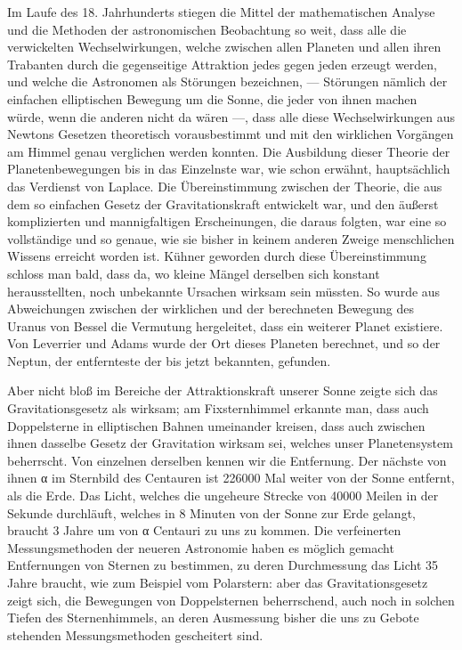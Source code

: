 \documentclass[a4paper, 11pt, oneside, german]{article}
\begin{document}
Im Laufe des 18. Jahrhunderts stiegen die Mittel der mathematischen Analyse und die Methoden der astronomischen Beobachtung so weit, dass alle die verwickelten Wechselwirkungen, welche zwischen allen Planeten und allen ihren Trabanten durch die gegenseitige Attraktion jedes gegen jeden erzeugt werden, und welche die Astronomen als Störungen bezeichnen, --- Störungen nämlich der einfachen elliptischen Bewegung um die Sonne, die jeder von ihnen machen würde, wenn die anderen nicht da wären ---, dass alle diese Wechselwirkungen aus Newtons Gesetzen theoretisch vorausbestimmt und mit den wirklichen Vorgängen am Himmel genau verglichen werden konnten. Die Ausbildung dieser Theorie der Planetenbewegungen bis in das Einzelnste war, wie schon erwähnt, hauptsächlich das Verdienst von Laplace. Die Übereinstimmung zwischen der Theorie, die aus dem so einfachen Gesetz der Gravitationskraft entwickelt war, und den äußerst komplizierten und mannigfaltigen Erscheinungen, die daraus folgten, war eine so vollständige und so genaue, wie sie bisher in keinem anderen Zweige menschlichen Wissens erreicht worden ist. Kühner geworden durch diese Übereinstimmung schloss man bald, dass da, wo kleine Mängel derselben sich konstant herausstellten, noch unbekannte Ursachen wirksam sein müssten. So wurde aus Abweichungen zwischen der wirklichen und der berechneten Bewegung des Uranus von Bessel die Vermutung hergeleitet, dass ein weiterer Planet existiere. Von Leverrier und Adams wurde der Ort dieses Planeten berechnet, und so der Neptun, der entfernteste der bis jetzt bekannten, gefunden.

Aber nicht bloß im Bereiche der Attraktionskraft unserer Sonne zeigte sich das Gravitationsgesetz als wirksam; am Fixsternhimmel erkannte man, dass auch Doppelsterne in elliptischen Bahnen umeinander kreisen, dass auch zwischen ihnen dasselbe Gesetz der Gravitation wirksam sei, welches unser Planetensystem beherrscht. Von einzelnen derselben kennen wir die Entfernung. Der nächste von ihnen α im Sternbild des Centauren ist 226000 Mal weiter von der Sonne entfernt, als die Erde. Das Licht, welches die ungeheure Strecke von 40000 Meilen in der Sekunde durchläuft, welches in 8 Minuten von der Sonne zur Erde gelangt, braucht 3 Jahre um von α Centauri zu uns zu kommen. Die verfeinerten Messungsmethoden der neueren Astronomie haben es möglich gemacht Entfernungen von Sternen zu bestimmen, zu deren Durchmessung das Licht 35 Jahre braucht, wie zum Beispiel vom Polarstern: aber das Gravitationsgesetz zeigt sich, die Bewegungen von Doppelsternen beherrschend, auch noch in solchen Tiefen des Sternenhimmels, an deren Ausmessung bisher die uns zu Gebote stehenden Messungsmethoden gescheitert sind.
\end{document}
